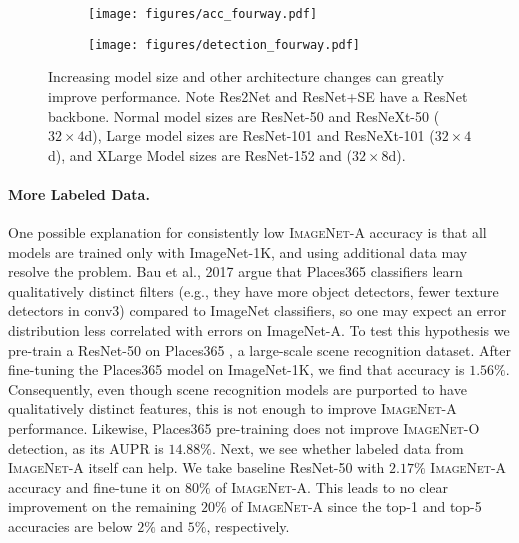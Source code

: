 \documentclass[10pt,twocolumn,letterpaper]{article}
\begin{document}
\begin{figure*}[t]
\vspace{-25pt}
\begin{subfigure}{.5\textwidth}
    \centering
    \texttt{[image: figures/acc\_fourway.pdf]}
\end{subfigure}\begin{subfigure}{.5\textwidth}
    \centering
    \texttt{[image: figures/detection\_fourway.pdf]}
\end{subfigure}\caption{Increasing model size and other architecture changes can greatly improve performance. Note Res2Net and ResNet+SE have a ResNet backbone. Normal model sizes are ResNet-50 and ResNeXt-50 ($32\times4$d), Large model sizes are ResNet-101 and ResNeXt-101 ($32\times4$d), and XLarge Model sizes are ResNet-152 and ($32\times8$d).}\label{fig:attn}
\vspace{-10pt}
\end{figure*}

\paragraph{More Labeled Data.}
One possible explanation for consistently low \textsc{ImageNet-A} accuracy is that all models are trained only with ImageNet-1K, and using additional data may resolve the problem. Bau et al., 2017 \cite{Bau2017NetworkDQ} argue that Places365 classifiers learn qualitatively distinct filters (e.g., they have more object detectors, fewer texture detectors in conv3) compared to ImageNet classifiers, so one may expect an error distribution less correlated with errors on ImageNet-A. To test this hypothesis we pre-train a ResNet-50 on Places365 \cite{zhou2017places}, a large-scale scene recognition dataset.
After fine-tuning the Places365 model on ImageNet-1K, we find that accuracy is $1.56\%$. Consequently, even though scene recognition models are purported to have qualitatively distinct features, this is not enough to improve \textsc{ImageNet-A} performance. Likewise, Places365 pre-training does not improve \textsc{ImageNet-O} detection, as its AUPR is $14.88\%$. Next, we see whether labeled data from \textsc{ImageNet-A} itself can help. We take baseline ResNet-50 with $2.17\%$ \textsc{ImageNet-A} accuracy and fine-tune it on $80\%$ of \textsc{ImageNet-A}. This leads to no clear improvement on the remaining $20\%$ of \textsc{ImageNet-A} since the top-1 and top-5 accuracies are below $2\%$ and $5\%$, respectively.
\end{document}
